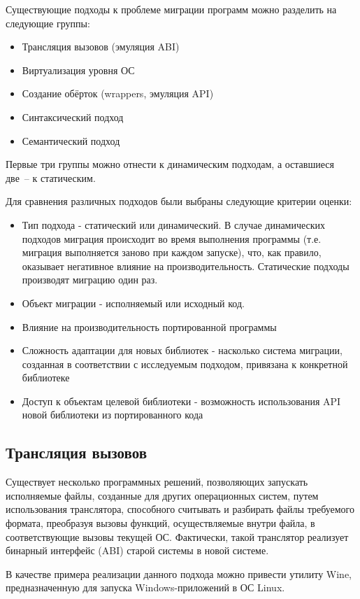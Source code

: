 Существующие подходы к проблеме миграции программ можно разделить на следующие группы:
\begin{itemize}
	\item Трансляция вызовов (эмуляция ABI)
	\item Виртуализация уровня ОС
	\item Создание обёрток (wrappers, эмуляция API)
	\item Синтаксический подход
	\item Семантический подход
\end{itemize}

Первые три группы можно отнести к динамическим подходам, а оставшиеся две~-- к статическим.

Для сравнения различных подходов были выбраны следующие критерии оценки:

\begin{itemize}
	\item Тип подхода - статический или динамический. В случае динамических подходов миграция происходит во время выполнения программы (т.е. миграция выполняется заново при каждом запуске), что, как правило, оказывает негативное влияние на производительность. Статические подходы производят миграцию один раз.
	\item Объект миграции - исполняемый или исходный код.
	\item Влияние на производительность портированной программы
	\item Сложность адаптации для новых библиотек - насколько система миграции, созданная в соответствии с исследуемым подходом, привязана к конкретной библиотеке
	\item Доступ к объектам целевой библиотеки - возможность использования API новой библиотеки из портированного кода
\end{itemize}

\subsection{Трансляция вызовов}
Существует несколько программных решений, позволяющих запускать исполняемые файлы, созданные для других операционных систем, путем использования транслятора, способного считывать и разбирать файлы требуемого формата, преобразуя вызовы функций, осуществляемые внутри файла, в соответствующие вызовы текущей ОС. Фактически, такой транслятор реализует бинарный интерфейс (ABI) старой системы в новой системе.

В качестве примера реализации данного подхода можно привести утилиту Wine, предназначенную для запуска Windows-приложений в ОС Linux.

